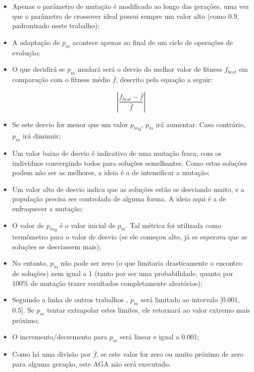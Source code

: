 \begin{itemize}

	\item Apenas o parâmetro de mutação é modificado ao longo das gerações, uma vez que o parâmetro de crossover ideal possui sempre um valor alto (como 0.9, padronizado neste trabalho);

	\item A adaptação de $p_m$ acontece apenas ao final de um ciclo de operações de evolução;

	\item O que decidirá se $p_m$ mudará será o desvio do melhor valor de fitness $f_{best}$ em comparação com o fitness médio $\bar{f}$, descrito pela equação a seguir:

\begin{equation}
	\left| \frac{f_{best} - \bar{f}}{\bar{f}} \right|
\label{eq:aga}
\end{equation}

	\item Se este desvio for menor que um valor ${p_m}_0$, $p_m$ irá aumentar. Caso contrário, $p_m$ irá diminuir;
	
	\item Um valor baixo de desvio é indicativo de uma mutação fraca, com os indivíduos convergindo todos para soluções semelhantes. Como estas soluções podem não ser as melhores, a ideia é a de intensificar a mutação;

	\item Um valor alto de desvio indica que as soluções estão se desviando muito, e a população precisa ser controlada de alguma forma. A ideia aqui é a de enfraquecer a mutação;

	\item O valor de ${p_m}_0$ é o valor inicial de $p_m$. Tal métrica foi utilizada como termômetro para o valor de desvio (se ele começou alto, já se esperava que as soluções se desviassem mais);

	\item No entanto, $p_m$ não pode ser zero (o que limitaria drasticamente o encontro de soluções) nem igual a 1 (tanto por ser uma probabilidade, quanto por 100\% de mutação trazer resultados completamente aleatórios);
	
	\item Seguindo a linha de outros trabalhos \cite{matthias2013variable}, $p_m$ será limitado ao intervalo [0.001, 0.5]. Se $p_m$ tentar extrapolar estes limites, ele retornará ao valor extremo mais próximo;

	\item O incremento/decremento para $p_m$ será linear e igual a 0.001;

	\item Como há uma divisão por $\bar{f}$, se este valor for zero ou muito próximo de zero para alguma geração, este AGA não será executado.

\end{itemize}

